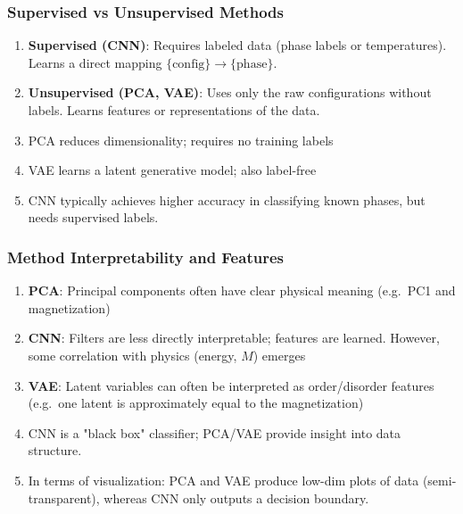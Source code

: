 \documentclass{beamer}
\begin{document}
\begin{frame}
\frametitle{Supervised vs Unsupervised Methods}

\begin{enumerate}
\item \textbf{Supervised (CNN)}: Requires labeled data (phase labels or temperatures). Learns a direct mapping $\{\text{config}\}\to\{\text{phase}\}$.

\item \textbf{Unsupervised (PCA, VAE)}: Uses only the raw configurations without labels. Learns features or representations of the data.

\item PCA reduces dimensionality; requires no training labels 

\item VAE learns a latent generative model; also label-free 

\item CNN typically achieves higher accuracy in classifying known phases, but needs supervised labels.
\end{enumerate}

\noindent
\end{frame}

\begin{frame}
\frametitle{Method Interpretability and Features}

\begin{enumerate}
\item \textbf{PCA}: Principal components often have clear physical meaning (e.g.\ PC1 and  magnetization) 

\item \textbf{CNN}: Filters are less directly interpretable; features are learned. However, some correlation with physics (energy, $M$) emerges 

\item \textbf{VAE}: Latent variables can often be interpreted as order/disorder features (e.g.~one latent is approximately equal to the  magnetization) 

\item CNN is a "black box" classifier; PCA/VAE provide insight into data structure.

\item In terms of visualization: PCA and VAE produce low-dim plots of data (semi-transparent), whereas CNN only outputs a decision boundary.
\end{enumerate}

\noindent
\end{frame}
\end{document}
